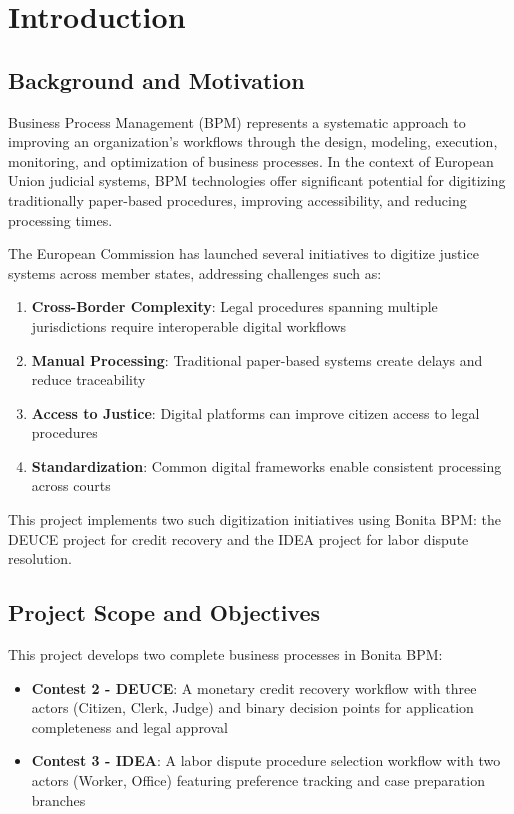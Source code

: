 \documentclass[12pt,a4paper]{article}
\begin{document}
\newpage

\section{Introduction}

\subsection{Background and Motivation}

Business Process Management (BPM) represents a systematic approach to improving an organization's workflows through the design, modeling, execution, monitoring, and optimization of business processes. In the context of European Union judicial systems, BPM technologies offer significant potential for digitizing traditionally paper-based procedures, improving accessibility, and reducing processing times.

The European Commission has launched several initiatives to digitize justice systems across member states, addressing challenges such as:

\begin{enumerate}
    \item \textbf{Cross-Border Complexity}: Legal procedures spanning multiple jurisdictions require interoperable digital workflows
    \item \textbf{Manual Processing}: Traditional paper-based systems create delays and reduce traceability
    \item \textbf{Access to Justice}: Digital platforms can improve citizen access to legal procedures
    \item \textbf{Standardization}: Common digital frameworks enable consistent processing across courts
\end{enumerate}

This project implements two such digitization initiatives using Bonita BPM: the DEUCE project for credit recovery and the IDEA project for labor dispute resolution.

\subsection{Project Scope and Objectives}

This project develops two complete business processes in Bonita BPM:

\begin{itemize}
    \item \textbf{Contest 2 - DEUCE}: A monetary credit recovery workflow with three actors (Citizen, Clerk, Judge) and binary decision points for application completeness and legal approval
    \item \textbf{Contest 3 - IDEA}: A labor dispute procedure selection workflow with two actors (Worker, Office) featuring preference tracking and case preparation branches
\end{itemize}
\end{document}
